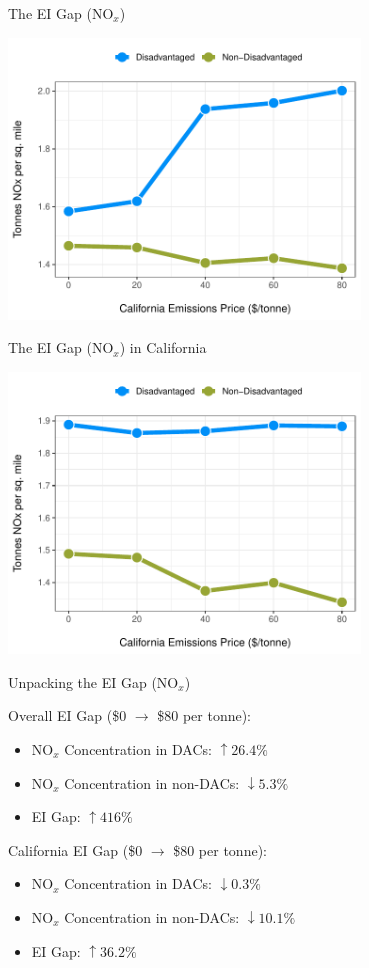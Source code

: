 \documentclass[11pt, aspectratio = 169]{beamer}
\newcommand{\1}{\mathds{1}}
\begin{document}
\begin{frame}{The EI Gap (NO$_x$)}

\centering
\includegraphics[width = 0.7\textwidth]{figures/chapter5_figures/ei_gap_bca_nox.pdf}

\end{frame}


\begin{frame}{The EI Gap (NO$_x$) in California}

\centering
\includegraphics[width = 0.7\textwidth]{figures/chapter5_figures/ei_gap_bca_nox_cal.pdf}

\end{frame}


\begin{frame}{Unpacking the EI Gap (NO$_x$)}
    
Overall EI Gap (\$0 $\to$ \$80 per tonne):
\begin{itemize}
    \item NO$_x$ Concentration in DACs: $\uparrow 26.4\%$
    \item NO$_x$ Concentration in non-DACs: $\downarrow 5.3\%$
    \item EI Gap: $\uparrow 416\%$
\end{itemize}

\vfill
California EI Gap (\$0 $\to$ \$80 per tonne):
\begin{itemize}
    \item NO$_x$ Concentration in DACs: $\downarrow 0.3\%$
    \item NO$_x$ Concentration in non-DACs: $\downarrow 10.1\%$
    \item EI Gap: $\uparrow 36.2\%$
\end{itemize}


\end{frame}
\end{document}
